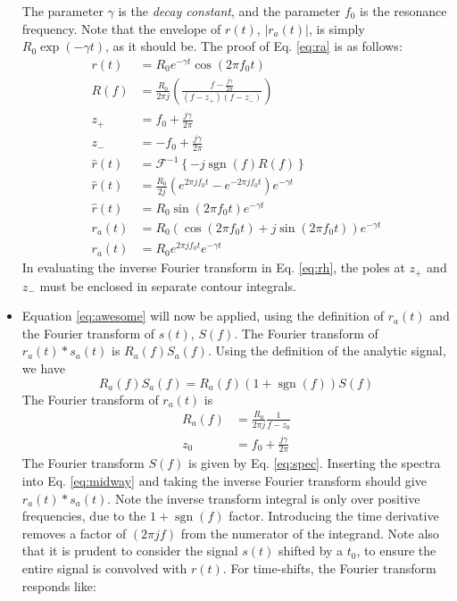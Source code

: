 \documentclass[amsmath,amssymb,aps,prd,10pt,twocolumn,showkeys]{revtex4}
\DeclareMathOperator{\sgn}{sgn}
\begin{document}
\begin{itemize}
The parameter $\gamma$ is the \textit{decay constant}, and the parameter $f_0$ is the resonance frequency.  Note that the envelope of $r(t)$, $|r_a(t)|$, is simply $R_0 \exp(-\gamma t)$, as it should be.  The proof of Eq. \ref{eq:ra} is as follows:
\begin{align}
r(t) &= R_0 e^{-\gamma t} \cos(2\pi f_0 t) \\
R(f) &= \frac{R_0}{2\pi j} \left( \frac{f - \frac{j\gamma}{2\pi}}{(f-z_+)(f-z_-)} \right) \\
z_+ &= f_0 + \frac{j\gamma}{2\pi} \\
z_- &= -f_0 + \frac{j\gamma}{2\pi} \\
\widehat{r}(t) &= \mathcal{F}^{-1}\left \lbrace - j \sgn(f) R(f) \right \rbrace \label{eq:rh} \\ 
\widehat{r}(t) &= \frac{R_0}{2j}\left( e^{2\pi j f_0 t} - e^{-2\pi j f_0 t} \right) e^{-\gamma t} \\
\widehat{r}(t) &= R_0 \sin(2\pi f_0 t) e^{-\gamma t} \\
r_a (t) &= R_0 \left(\cos(2\pi f_0 t) + j\sin(2\pi f_0 t)\right) e^{-\gamma t} \\
r_a (t) &= R_0 e^{2\pi j f_0 t} e^{-\gamma t}
\end{align}
In evaluating the inverse Fourier transform in Eq. \ref{eq:rh}, the poles at $z_+$ and $z_-$ must be enclosed in separate contour integrals.
\item Equation \ref{eq:awesome} will now be applied, using the definition of $r_a(t)$ and the Fourier transform of $s(t)$, $S(f)$.  The Fourier transform of $r_a(t) * s_a(t)$ is $R_a(f) S_a(f)$.  Using the definition of the analytic signal, we have
\begin{equation}
R_a(f) S_a(f) = R_a(f)(1 + \sgn(f)) S(f) \label{eq:midway}
\end{equation}
The Fourier transform of $r_a(t)$ is
\begin{align}
R_a(f) &= \frac{R_0}{2\pi j} \frac{1}{f-z_0} \\
z_0 &= f_0 + \frac{j\gamma}{2\pi}
\end{align}
The Fourier transform $S(f)$ is given by Eq. \ref{eq:spec}.  Inserting the spectra into Eq. \ref{eq:midway} and taking the inverse Fourier transform should give $r_a(t) * s_a(t)$.  Note the inverse transform integral is only over positive frequencies, due to the $1+\sgn(f)$ factor.  Introducing the time derivative removes a factor of $(2\pi j f)$ from the numerator of the integrand.  Note also that it is prudent to consider the signal $s(t)$ shifted by a $t_0$, to ensure the entire signal is convolved with $r(t)$.  For time-shifts, the Fourier transform responds like:

\end{itemize}
\end{document}
